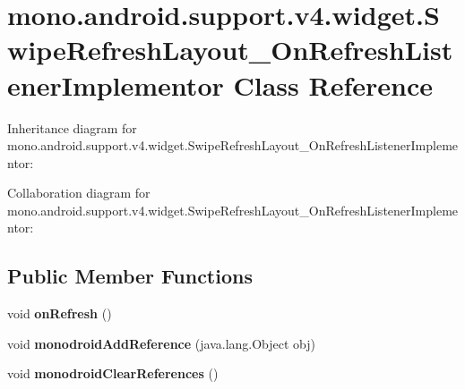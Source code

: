 \hypertarget{classmono_1_1android_1_1support_1_1v4_1_1widget_1_1_swipe_refresh_layout___on_refresh_listener_implementor}{}\section{mono.\+android.\+support.\+v4.\+widget.\+Swipe\+Refresh\+Layout\+\_\+\+On\+Refresh\+Listener\+Implementor Class Reference}
\label{classmono_1_1android_1_1support_1_1v4_1_1widget_1_1_swipe_refresh_layout___on_refresh_listener_implementor}


Inheritance diagram for mono.\+android.\+support.\+v4.\+widget.\+Swipe\+Refresh\+Layout\+\_\+\+On\+Refresh\+Listener\+Implementor\+:


Collaboration diagram for mono.\+android.\+support.\+v4.\+widget.\+Swipe\+Refresh\+Layout\+\_\+\+On\+Refresh\+Listener\+Implementor\+:
\subsection*{Public Member Functions}
\begin{DoxyCompactItemize}
\item 
\mbox{\label{classmono_1_1android_1_1support_1_1v4_1_1widget_1_1_swipe_refresh_layout___on_refresh_listener_implementor_a74f3896d97f8baf7046389f758407a1c}} 
void {\bfseries on\+Refresh} ()
\item 
\mbox{\label{classmono_1_1android_1_1support_1_1v4_1_1widget_1_1_swipe_refresh_layout___on_refresh_listener_implementor_a422bf9708796c9a0bcaaec2137d8200a}} 
void {\bfseries monodroid\+Add\+Reference} (java.\+lang.\+Object obj)
\item 
\mbox{\label{classmono_1_1android_1_1support_1_1v4_1_1widget_1_1_swipe_refresh_layout___on_refresh_listener_implementor_a2669d5c1b40a370723a749b9aa381407}} 
void {\bfseries monodroid\+Clear\+References} ()
\end{DoxyCompactItemize}
